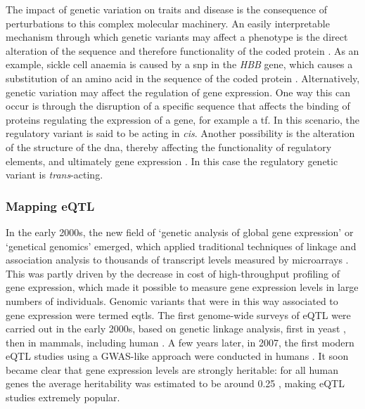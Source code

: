 The impact of genetic variation on traits and disease is the consequence of perturbations to this complex molecular machinery.
An easily interpretable mechanism through which genetic variants may affect a phenotype is the direct alteration of the sequence 
and therefore functionality of the coded protein \cite{westra2014genome}. 
As an example, sickle cell anaemia is caused by a \gls{snp} in the \textit{HBB} gene, which causes a substitution of an amino acid in the sequence of the coded protein \cite{laird2010fundamentals}. 
Alternatively, genetic variation may affect the regulation of gene expression. 
One way this can occur is through the disruption of a specific sequence that affects the binding of
proteins regulating the expression of a gene, 
for example 
a \gls{tf}. 
In this scenario, the regulatory variant is said to be acting in \textit{cis}.
Another possibility is the alteration of the structure of the \gls{dna}, thereby affecting the functionality of regulatory elements, and ultimately gene expression \cite{encode2004encode, kundaje2015integrative}. 
In this case the regulatory 
genetic 
variant is \textit{trans}-acting. 

\subsubsection{Mapping eQTL}
\label{sec:eqtl_map}

In the early 2000s, the new field of `genetic analysis of global gene expression' or `genetical genomics' \cite{jansen2001genetical} emerged, which applied traditional techniques of linkage and association analysis to thousands of transcript levels measured by microarrays \cite{rockman2006genetics}.
This was partly driven by the decrease in cost of high-throughput profiling of gene expression, which made it possible to measure gene expression levels in large numbers of individuals.
Genomic variants that were in this way associated to gene expression were termed \glspl{eqtl}. 
The first genome-wide surveys of eQTL were carried out in the early 2000s, based on genetic linkage analysis, first in yeast \cite{brem2002genetic}, then in mammals, including human \cite{schadt2003genetics}. 
A few years later, in 2007, the first modern eQTL studies using a GWAS-like approach were conducted in humans \cite{stranger2007population, dixon2007genome}. 
It soon became clear that gene expression levels are strongly heritable: for all human genes the average heritability was estimated to be around 0.25 \cite{ricano2013mapping, dunham2012integrated, maurano2012systematic, westra2014genome}, making eQTL studies extremely popular.

